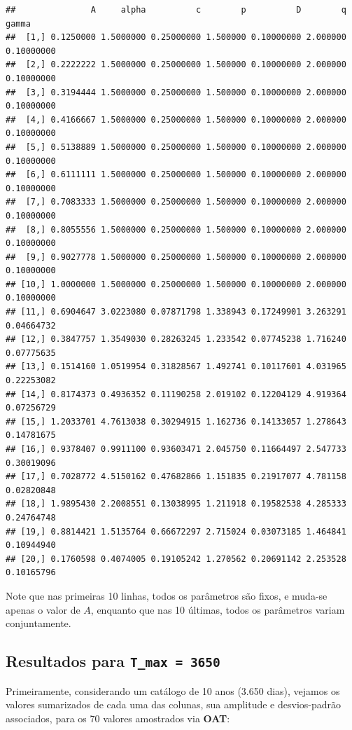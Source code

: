 \documentclass[11pt,]{article}
\begin{document}
\begin{verbatim}
##               A     alpha          c        p          D        q      gamma
##  [1,] 0.1250000 1.5000000 0.25000000 1.500000 0.10000000 2.000000 0.10000000
##  [2,] 0.2222222 1.5000000 0.25000000 1.500000 0.10000000 2.000000 0.10000000
##  [3,] 0.3194444 1.5000000 0.25000000 1.500000 0.10000000 2.000000 0.10000000
##  [4,] 0.4166667 1.5000000 0.25000000 1.500000 0.10000000 2.000000 0.10000000
##  [5,] 0.5138889 1.5000000 0.25000000 1.500000 0.10000000 2.000000 0.10000000
##  [6,] 0.6111111 1.5000000 0.25000000 1.500000 0.10000000 2.000000 0.10000000
##  [7,] 0.7083333 1.5000000 0.25000000 1.500000 0.10000000 2.000000 0.10000000
##  [8,] 0.8055556 1.5000000 0.25000000 1.500000 0.10000000 2.000000 0.10000000
##  [9,] 0.9027778 1.5000000 0.25000000 1.500000 0.10000000 2.000000 0.10000000
## [10,] 1.0000000 1.5000000 0.25000000 1.500000 0.10000000 2.000000 0.10000000
## [11,] 0.6904647 3.0223080 0.07871798 1.338943 0.17249901 3.263291 0.04664732
## [12,] 0.3847757 1.3549030 0.28263245 1.233542 0.07745238 1.716240 0.07775635
## [13,] 0.1514160 1.0519954 0.31828567 1.492741 0.10117601 4.031965 0.22253082
## [14,] 0.8174373 0.4936352 0.11190258 2.019102 0.12204129 4.919364 0.07256729
## [15,] 1.2033701 4.7613038 0.30294915 1.162736 0.14133057 1.278643 0.14781675
## [16,] 0.9378407 0.9911100 0.93603471 2.045750 0.11664497 2.547733 0.30019096
## [17,] 0.7028772 4.5150162 0.47682866 1.151835 0.21917077 4.781158 0.02820848
## [18,] 1.9895430 2.2008551 0.13038995 1.211918 0.19582538 4.285333 0.24764748
## [19,] 0.8814421 1.5135764 0.66672297 2.715024 0.03073185 1.464841 0.10944940
## [20,] 0.1760598 0.4074005 0.19105242 1.270562 0.20691142 2.253528 0.10165796
\end{verbatim}

Note que nas primeiras 10 linhas, todos os parâmetros são fixos, e
muda-se apenas o valor de \(A\), enquanto que nas 10 últimas, todos os
parâmetros variam conjuntamente.

\hypertarget{resultados-para}{%
\subsection{\texorpdfstring{Resultados para
\texttt{T_max = 3650}}{Resultados para }}\label{resultados-para}}

Primeiramente, considerando um catálogo de 10 anos (3.650 dias), vejamos
os valores sumarizados de cada uma das colunas, sua amplitude e
desvios-padrão associados, para os 70 valores amostrados via
\textbf{OAT}:
\end{document}
